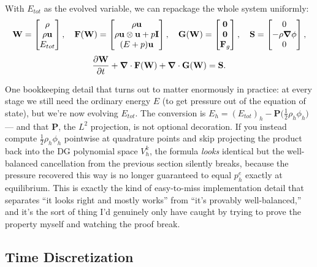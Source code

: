 With $E_{tot}$ as the evolved variable, we can repackage the whole system uniformly:
\[
	\mathbf{W} = \begin{bmatrix}\rho\\ \rho\mathbf{u}\\ E_{tot}\end{bmatrix}, \quad
	\mathbf{F}(\mathbf{W}) = \begin{bmatrix}\rho\mathbf{u}\\ \rho\mathbf{u}\otimes\mathbf{u}+p\mathbf{I}\\ (E+p)\mathbf{u}\end{bmatrix}, \quad
	\mathbf{G}(\mathbf{W}) = \begin{bmatrix}\mathbf{0}\\ \mathbf{0}\\ \mathbf{F}_g\end{bmatrix}, \quad
	\mathbf{S} = \begin{bmatrix}0\\ -\rho\grad\phi\\ 0\end{bmatrix},
\]
\[
	\pdv{\mathbf{W}}{t} + \grad\cdot\mathbf{F}(\mathbf{W}) + \grad\cdot\mathbf{G}(\mathbf{W}) = \mathbf{S}.
\]

One bookkeeping detail that turns out to matter enormously in practice: at every stage we still need the ordinary energy $E$ (to get pressure out of the equation of state), but we're now evolving $E_{tot}$. The conversion is $E_h = (E_{tot})_h - \mathbf{P}\big(\tfrac12\rho_h\phi_h\big)$ — and that $\mathbf{P}$, the $L^2$ projection, is not optional decoration. If you instead compute $\tfrac12\rho_h\phi_h$ pointwise at quadrature points and skip projecting the product back into the DG polynomial space $V_h^k$, the formula \emph{looks} identical but the well-balanced cancellation from the previous section silently breaks, because the pressure recovered this way is no longer guaranteed to equal $p_h^e$ exactly at equilibrium. This is exactly the kind of easy-to-miss implementation detail that separates ``it looks right and mostly works'' from ``it's provably well-balanced,'' and it's the sort of thing I'd genuinely only have caught by trying to prove the property myself and watching the proof break.

\subsection{Time Discretization}

